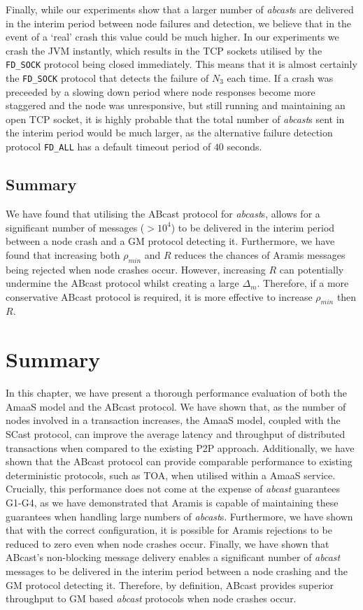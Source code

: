     Finally, while our experiments show that a larger number of \emph{abcast}s are delivered in the interim period between node failures and detection, we believe that in the event of a \textquoteleft{}real' crash this value could be much higher.  In our experiments we crash the JVM instantly, which results in the TCP sockets utilised by the \texttt{FD\_SOCK} protocol being closed immediately.  This means that it is almost certainly the \texttt{FD\_SOCK} protocol that detects the failure of $N_3$ each time.  If a crash was preceeded by a slowing down period where node responses become more staggered and the node was unresponsive, but still running and maintaining an open TCP socket, it is highly probable that the total number of \emph{abcast}s sent in the interim period would be much larger, as the alternative failure detection protocol \texttt{FD\_ALL} has a default timeout period of $40$ seconds.  
        
    \subsection{Summary}
        We have found that utilising the \textsf{ABcast} protocol for \emph{abcast}s, allows for a significant number of messages ($> 10^4$) to be delivered in the interim period between a node crash and a GM protocol detecting it.  Furthermore, we have found that increasing both $\rho_{min}$ and $R$ reduces the chances of \textsf{Aramis} messages being rejected when node crashes occur.  However, increasing $R$ can potentially undermine the \textsf{ABcast} protocol whilst creating a large $\Delta_m$.  Therefore, if a more conservative \textsf{ABcast} protocol is required, it is more effective to increase $\rho_{min}$ then $R$.  
        
\section{Summary}
In this chapter, we have present a thorough performance evaluation of both the \textsf{AmaaS} model and the \textsf{ABcast} protocol.  We have shown that, as the number of nodes involved in a transaction increases, the \textsf{AmaaS} model, coupled with the \textsf{SCast} protocol, can improve the average latency and throughput of distributed transactions when compared to the existing P2P approach.  Additionally, we have shown that the \textsf{ABcast} protocol can provide comparable performance to existing deterministic protocols, such as TOA, when utilised within a \textsf{AmaaS} service.  Crucially, this performance does not come at the expense of \emph{abcast} guarantees G1-G4, as we have demonstrated that \textsf{Aramis} is capable of maintaining these guarantees when handling large numbers of \emph{abcast}s.  Furthermore, we have shown that with the correct configuration, it is possible for \textsf{Aramis} rejections to be reduced to zero even when node crashes occur.  Finally, we have shown that \textsf{ABcast}'s non-blocking message delivery enables a significant number of \emph{abcast} messages to be delivered in the interim period between a node crashing and the GM protocol detecting it.  Therefore, by definition, \textsf{ABcast} provides superior throughput to GM based \emph{abcast} protocols when node crashes occur.  